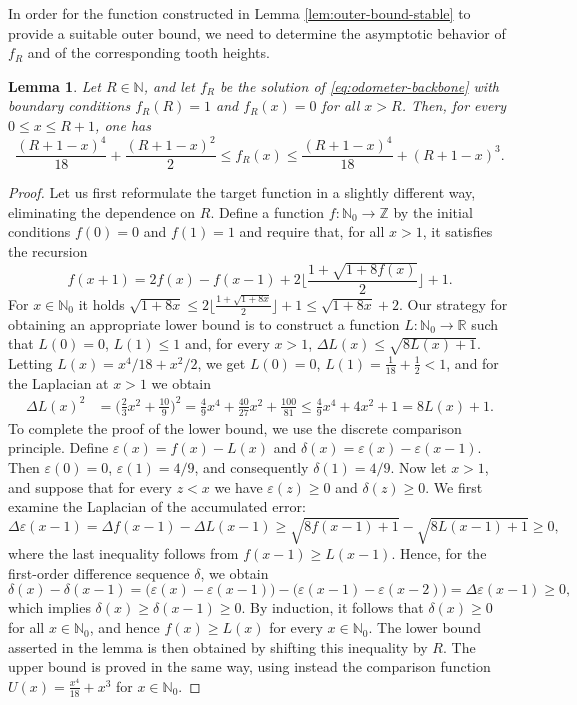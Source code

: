 \documentclass[11pt]{article}
\newtheorem{lemma}{Lemma}[section]
\newcommand{\N}{\mathbb{N}}
\begin{document}
In order for the function constructed in Lemma \ref{lem:outer-bound-stable} to provide a suitable outer bound, we need to determine the asymptotic behavior of $f_R$ and of the corresponding tooth heights.
\begin{lemma}\label{lem:outer-bound-asymptotics}
    Let $R\in\mathbb{N}$, and let $f_R$ be the solution of \eqref{eq:odometer-backbone} with boundary conditions $f_R(R)=1$ and $f_R(x)=0$ for all $x>R$. Then, for every $0\leq x\leq R+1$, one has
\[
    \frac{(R+1-x)^4}{18}+\frac{(R+1-x)^2}{2}\leq f_R(x)\leq\frac{(R+1-x)^4}{18}+(R+1-x)^3.
\]
\end{lemma}
\begin{proof} Let us first reformulate the target function in a slightly different way, eliminating the dependence on $R$. Define a function $f:\mathbb{N}_0\to\mathbb{Z}$ by the initial conditions $f(0)=0$ and $f(1)=1$ and require that, for all $x>1$, it satisfies the recursion
\[
f(x+1)=2f(x)-f(x-1)+2\Big\lfloor \frac{1+\sqrt{1+8f(x)}}{2}\Big\rfloor+1.
\]
For  $x\in\N_0$ it holds $\sqrt{1+8x}\leq 2\Big\lfloor \frac{1+\sqrt{1+8x}}{2}\Big\rfloor+1\leq \sqrt{1+8x}+2$. Our strategy for obtaining an appropriate lower bound is to construct a function $L:\mathbb{N}_0\to\mathbb{R}$ such that $L(0)=0$, $L(1)\leq 1$
and, for every $x>1$, $\Delta L(x)\leq \sqrt{8L(x)+1}$. Letting $L(x)=x^4/18+x^2/2$, we get
$L(0)=0$, $L(1)=\frac{1}{18}+\frac{1}{2}<1$, and for the Laplacian at $x>1$ we obtain
    \begin{align*}
        \Delta L(x)^2&=\Big(\frac{2}{3}x^2+\frac{10}{9}\Big)^2=\frac{4}{9}x^4+\frac{40}{27}x^2+\frac{100}{81}\leq \frac{4}{9}x^4+4x^2+1=8L(x)+1.
    \end{align*}
    To complete the proof of the lower bound, we use the discrete comparison principle. Define $\varepsilon(x)=f(x)-L(x)$ and $\delta(x)=\varepsilon(x)-\varepsilon(x-1)$. Then $\varepsilon(0)=0$, $\varepsilon(1)=4/9$, and consequently $\delta(1)=4/9$. Now let $x>1$, and suppose that for every $z<x$ we have $\varepsilon(z)\geq 0$ and $\delta(z)\geq 0$. We first examine the Laplacian of the accumulated error:
\[
\Delta \varepsilon(x-1)=\Delta f(x-1)-\Delta L(x-1)\geq\sqrt{8f(x-1)+1}-\sqrt{8L(x-1)+1}\geq 0,
\]
where the last inequality follows from $f(x-1)\geq L(x-1)$. Hence, for the first-order difference sequence $\delta$, we obtain
\[
\delta(x)-\delta(x-1)=\bigl(\varepsilon(x)-\varepsilon(x-1)\bigr)-\bigl(\varepsilon(x-1)-\varepsilon(x-2)\bigr)=\Delta \varepsilon(x-1)\geq 0,
\]
which implies $\delta(x)\geq \delta(x-1)\geq 0$. 
By induction, it follows that $\delta(x)\geq 0$ for all $x\in\mathbb{N}_0$, and hence $f(x)\geq L(x)$ for every $x\in\mathbb{N}_0$. The lower bound asserted in the lemma is then obtained by shifting this inequality by $R$. The upper bound is proved in the same way, using instead the comparison function $U(x)=\frac{x^4}{18}+x^3$ for $x\in\mathbb{N}_0$.
\end{proof}
\end{document}
